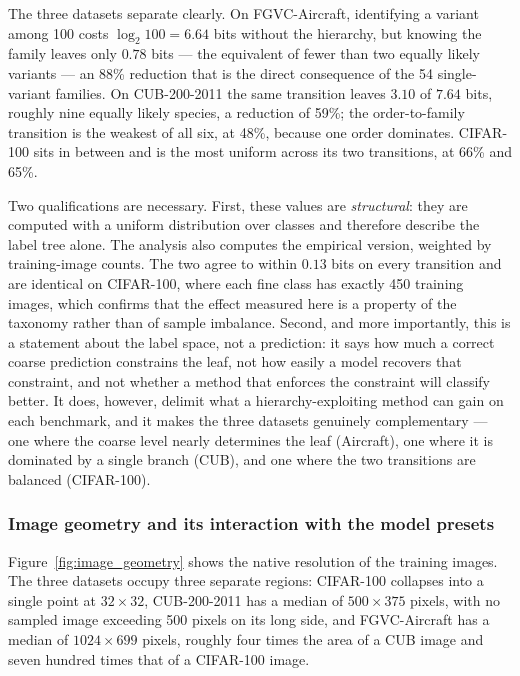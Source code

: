 The three datasets separate clearly. On FGVC-Aircraft, identifying a variant among 100 costs $\log_2 100 = 6.64$ bits without the hierarchy, but knowing the family leaves only $0.78$ bits --- the equivalent of fewer than two equally likely variants --- an 88\% reduction that is the direct consequence of the 54 single-variant families. On CUB-200-2011 the same transition leaves $3.10$ of $7.64$ bits, roughly nine equally likely species, a reduction of 59\%; the order-to-family transition is the weakest of all six, at 48\%, because one order dominates. CIFAR-100 sits in between and is the most uniform across its two transitions, at 66\% and 65\%.

Two qualifications are necessary. First, these values are \emph{structural}: they are computed with a uniform distribution over classes and therefore describe the label tree alone. The analysis also computes the empirical version, weighted by training-image counts. The two agree to within $0.13$ bits on every transition and are identical on CIFAR-100, where each fine class has exactly 450 training images, which confirms that the effect measured here is a property of the taxonomy rather than of sample imbalance. Second, and more importantly, this is a statement about the label space, not a prediction: it says how much a correct coarse prediction constrains the leaf, not how easily a model recovers that constraint, and not whether a method that enforces the constraint will classify better. It does, however, delimit what a hierarchy-exploiting method can gain on each benchmark, and it makes the three datasets genuinely complementary --- one where the coarse level nearly determines the leaf (Aircraft), one where it is dominated by a single branch (CUB), and one where the two transitions are balanced (CIFAR-100).

\subsubsection{Image geometry and its interaction with the model presets}

Figure~\ref{fig:image_geometry} shows the native resolution of the training images. The three datasets occupy three separate regions: CIFAR-100 collapses into a single point at $32\times32$, CUB-200-2011 has a median of $500\times375$ pixels, with no sampled image exceeding 500 pixels on its long side, and FGVC-Aircraft has a median of $1024\times699$ pixels, roughly four times the area of a CUB image and seven hundred times that of a CIFAR-100 image.

